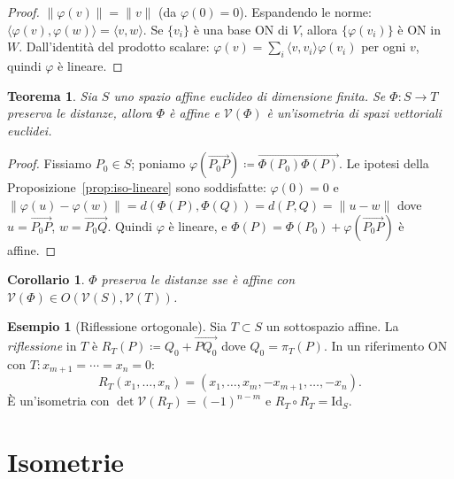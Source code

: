 \documentclass[11pt, a4paper]{book}
\theoremstyle{definition}
\newtheorem{esempio}[definizione]{Esempio}
\theoremstyle{plain}
\newtheorem{teorema}[definizione]{Teorema}
\newtheorem{corollario}[definizione]{Corollario}
\theoremstyle{remark}
\newcommand{\Id}{\mathrm{Id}}
\begin{document}
\begin{proof}
$\|\varphi(v)\|=\|v\|$ (da $\varphi(0)=0$). Espandendo le norme: $\langle\varphi(v),\varphi(w)\rangle = \langle v,w\rangle$. Se $\{v_i\}$ è una base ON di $V$, allora $\{\varphi(v_i)\}$ è ON in $W$. Dall'identità del prodotto scalare: $\varphi(v) = \sum_i\langle v,v_i\rangle\varphi(v_i)$ per ogni $v$, quindi $\varphi$ è lineare.
\end{proof}

\begin{teorema}
\label{thm:isometrie-affini}
Sia $S$ uno spazio affine euclideo di dimensione finita. Se $\Phi \colon S \to T$ preserva le distanze, allora $\Phi$ è affine e $\mathcal{V}(\Phi)$ è un'isometria di spazi vettoriali euclidei.
\end{teorema}

\begin{proof}
Fissiamo $P_0 \in S$; poniamo $\varphi(\overrightarrow{P_0 P}) \coloneqq \overrightarrow{\Phi(P_0)\Phi(P)}$. Le ipotesi della Proposizione~\ref{prop:iso-lineare} sono soddisfatte: $\varphi(0)=0$ e $\|\varphi(u)-\varphi(w)\| = d(\Phi(P),\Phi(Q)) = d(P,Q) = \|u-w\|$ dove $u=\overrightarrow{P_0 P}$, $w=\overrightarrow{P_0 Q}$. Quindi $\varphi$ è lineare, e $\Phi(P) = \Phi(P_0)+\varphi(\overrightarrow{P_0 P})$ è affine.
\end{proof}

\begin{corollario}
$\Phi$ preserva le distanze sse è affine con $\mathcal{V}(\Phi) \in O(\mathcal{V}(S),\mathcal{V}(T))$.
\end{corollario}

\begin{exbox}
\begin{esempio}[Riflessione ortogonale]
\label{es:riflessione}
Sia $T \subset S$ un sottospazio affine. La \emph{riflessione} in $T$ è $R_T(P) \coloneqq Q_0 + \overrightarrow{PQ_0}$ dove $Q_0 = \pi_T(P)$. In un riferimento ON con $T: x_{m+1}=\cdots=x_n=0$:
\[
  R_T(x_1,\ldots,x_n) = (x_1,\ldots,x_m,-x_{m+1},\ldots,-x_n).
\]
È un'isometria con $\det\mathcal{V}(R_T)=(-1)^{n-m}$ e $R_T\circ R_T = \Id_S$.
\end{esempio}
\end{exbox}

\section{Isometrie}
\label{sec:isometrie-affini}
\end{document}
